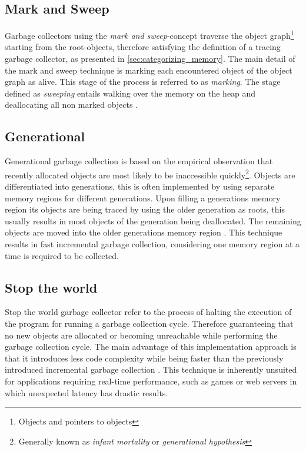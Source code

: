 \subsection{Mark and Sweep}
\label{sec:gc_mark_sweep}

Garbage collectors using the \textit{mark and sweep}-concept traverse the
object graph\footnote{Objects and pointers to objects} starting from the
root-objects, therefore satisfying the definition of a tracing garbage
collector, as presented in \autoref{sec:categorizing_memory}. The main detail
of the mark and sweep technique is marking each encountered object of the
object graph as alive. This stage of the process is referred to as
\textit{marking}. The stage defined as \textit{sweeping} entails walking over
the memory on the heap and deallocating all non marked objects \cite[Tracing
Garbage Collection]{go_gcguide_2022}.

\subsection{Generational}
\label{sec:gc_generational}

Generational garbage collection is based on the empirical observation that
recently allocated objects are most likely to be inaccessible
quickly\footnote{Generally known as \textit{infant mortality} or
\textit{generational hypothesis}}. Objects are differentiated into generations,
this is often implemented by using separate memory regions for different
generations. Upon filling a generations memory region its objects are being
traced by using the older generation as roots, this usually results in most
objects of the generation being deallocated. The remaining objects are moved
into the older generations memory region \cite[2 Age-based Garbage
Collection]{age-based-gc_1999}. This technique results in fast incremental
garbage collection, considering one memory region at a time is required to be
collected. \cite[3 Benchmarks]{age-based-gc_1999}

\subsection{Stop the world}

Stop the world garbage collector refer to the process of halting the execution
of the program for running a garbage collection cycle. Therefore guaranteeing
that no new objects are allocated or becoming unreachable while performing the
garbage collection cycle. The main advantage of this implementation approach
is that it introduces less code complexity while being faster than the
previously introduced incremental garbage collection \cite[5. The Garbage
Collection Algorithms]{gc-multiprocess_1975}. This technique is inherently
unsuited for applications requiring real-time performance, such as games or
web servers in which unexpected latency has drastic results.

